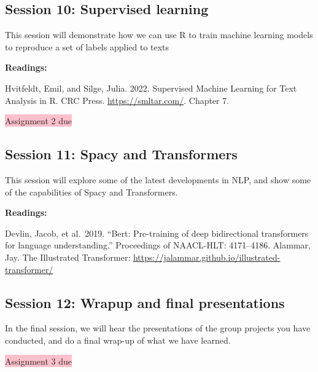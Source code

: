 \documentclass[
]{article}
\begin{document}
\hypertarget{session-10-supervised-learning}{%
\subsection{Session 10: Supervised
learning}\label{session-10-supervised-learning}}

This session will demonstrate how we can use R to train machine learning
models to reproduce a set of labels applied to texts

\textbf{Readings:}

Hvitfeldt, Emil, and Silge, Julia. 2022. Supervised Machine Learning for
Text Analysis in R. CRC Press. \url{https://smltar.com/}. Chapter 7.

\colorbox{pink}{Assignment 2 due}

\hypertarget{session-11-spacy-and-transformers}{%
\subsection{Session 11: Spacy and
Transformers}\label{session-11-spacy-and-transformers}}

This session will explore some of the latest developments in NLP, and
show some of the capabilities of Spacy and Transformers.

\textbf{Readings:}

Devlin, Jacob, et al.~2019. ``Bert: Pre-training of deep bidirectional
transformers for language understanding.'' Proceedings of NAACL-HLT:
4171--4186. Alammar, Jay. The Illustrated Transformer:
\url{https://jalammar.github.io/illustrated-transformer/}

\hypertarget{session-12-wrapup-and-final-presentations}{%
\subsection{Session 12: Wrapup and final
presentations}\label{session-12-wrapup-and-final-presentations}}

In the final session, we will hear the presentations of the group
projects you have conducted, and do a final wrap-up of what we have
learned.

\colorbox{pink}{Assignment 3 due}

  
\end{document}
